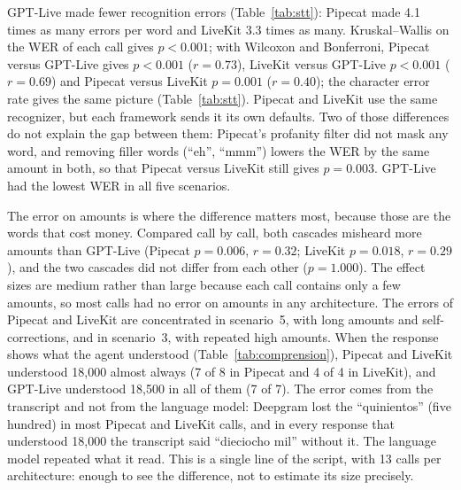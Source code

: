 \documentclass[11pt]{article}
\newcommand{\RCompCorregidoC}{7}
\newcommand{\RCompNA}{13}
\newcommand{\RCompRetractadoA}{7}
\newcommand{\RCompRetractadoB}{4}
\newcommand{\RCompVisibleA}{8}
\newcommand{\RCompVisibleB}{4}
\newcommand{\RCompVisibleC}{7}
\newcommand{\RMontosEfectoDosTres}{0.29}
\newcommand{\RMontosEfectoUnoTres}{0.32}
\newcommand{\RMontosWPBonfDosTresTxt}{$p=0.018$}
\newcommand{\RMontosWPBonfUnoDosTxt}{$p=1.000$}
\newcommand{\RMontosWPBonfUnoTresTxt}{$p=0.006$}
\newcommand{\RSensPBonfSm}{0.003}
\newcommand{\RWerEfectoDosTres}{0.69}
\newcommand{\RWerEfectoUnoDos}{0.40}
\newcommand{\RWerEfectoUnoTres}{0.73}
\newcommand{\RWerKwPTxt}{$p<0.001$}
\newcommand{\RWerVecesA}{4.1}
\newcommand{\RWerVecesB}{3.3}
\newcommand{\RWerWPBonfDosTresTxt}{$p<0.001$}
\newcommand{\RWerWPBonfUnoDosTxt}{$p=0.001$}
\newcommand{\RWerWPBonfUnoTresTxt}{$p<0.001$}
\begin{document}
GPT-Live made fewer recognition errors (Table~\ref{tab:stt}): Pipecat made \RWerVecesA{}
times as many errors per word and LiveKit \RWerVecesB{} times as many. Kruskal--Wallis on
the WER of each call gives \RWerKwPTxt; with Wilcoxon and Bonferroni, Pipecat versus GPT-Live
gives \RWerWPBonfUnoTresTxt{} ($r=\RWerEfectoUnoTres$), LiveKit versus GPT-Live \RWerWPBonfDosTresTxt{} ($r=\RWerEfectoDosTres$) and Pipecat versus LiveKit \RWerWPBonfUnoDosTxt{} ($r=\RWerEfectoUnoDos$); the character error rate gives the same picture (Table~\ref{tab:stt}). Pipecat and LiveKit use the same recognizer, but each framework
sends it its own defaults. Two of those differences do not explain the gap between
them: Pipecat's profanity filter did not mask any word, and removing filler words (``eh'',
``mmm'') lowers the WER by the same amount in both, so that Pipecat versus LiveKit still
gives $p=\RSensPBonfSm$. GPT-Live had the lowest WER in all five scenarios.

The error on amounts is where the difference matters most, because those are the words that cost money.
Compared call by call, both cascades misheard more amounts than GPT-Live (Pipecat \RMontosWPBonfUnoTresTxt, $r=\RMontosEfectoUnoTres$; LiveKit \RMontosWPBonfDosTresTxt, $r=\RMontosEfectoDosTres$), and the two cascades did not differ from each other (\RMontosWPBonfUnoDosTxt).
The effect sizes are medium rather than large because each call contains only a few amounts, so most calls had no error on amounts in any architecture.
The errors of Pipecat and LiveKit are concentrated in scenario~5, with long amounts and self-corrections, and in
scenario~3, with repeated high amounts. When the response shows what the agent
understood (Table~\ref{tab:comprension}), Pipecat and LiveKit understood 18,000 almost
always (\RCompRetractadoA{} of \RCompVisibleA{} in Pipecat and \RCompRetractadoB{} of
\RCompVisibleB{} in LiveKit), and GPT-Live understood 18,500 in all of them
(\RCompCorregidoC{} of \RCompVisibleC). The error comes from the transcript and not
from the language model: Deepgram lost the ``quinientos'' (five hundred) in most Pipecat and LiveKit calls, and in every response that understood 18,000 the transcript said
``dieciocho mil'' without it. The language model repeated what it read. This is a
single line of the script, with \RCompNA{} calls per architecture: enough to see the
difference, not to estimate its size precisely.
\end{document}

